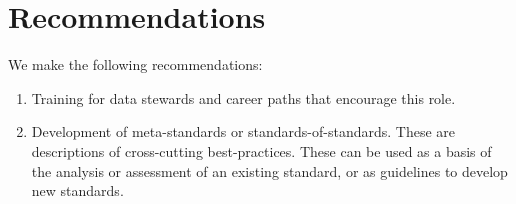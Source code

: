 \documentclass[
  letterpaper,
  DIV=11,
  numbers=noendperiod]{scrartcl}
\providecommand{\tightlist}{%
  \setlength{\itemsep}{0pt}\setlength{\parskip}{0pt}}\usepackage{longtable,booktabs,array}
\begin{document}
\section{Recommendations}\label{recommendations}

We make the following recommendations:

\begin{enumerate}
\def\labelenumi{\arabic{enumi}.}
\tightlist
\item
  Training for data stewards and career paths that encourage this role.
\item
  Development of meta-standards or standards-of-standards. These are
  descriptions of cross-cutting best-practices. These can be used as a
  basis of the analysis or assessment of an existing standard, or as
  guidelines to develop new standards.
\end{enumerate}
\end{document}
